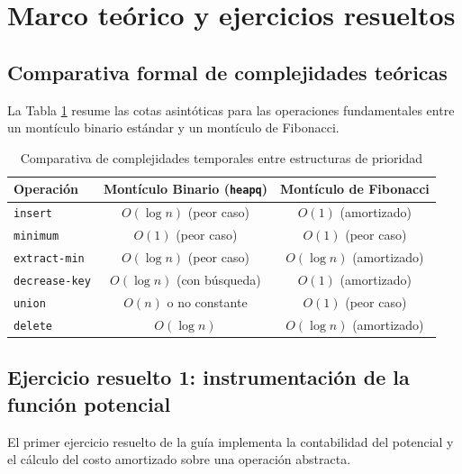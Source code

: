 \section{Marco teórico y ejercicios resueltos}

\subsection{Comparativa formal de complejidades teóricas}
La Tabla \ref{tab:complejidad_teorica} resume las cotas asintóticas para las operaciones fundamentales entre un montículo binario estándar y un montículo de Fibonacci.

\begin{table}[H]
    \caption{Comparativa de complejidades temporales entre estructuras de prioridad}
    \label{tab:complejidad_teorica}
    \centering
    \small
    \begin{tabular*}{\textwidth}{@{\extracolsep{\fill}}lcc}
        \toprule
        \textbf{Operación} & \textbf{Montículo Binario (\texttt{heapq})} & \textbf{Montículo de Fibonacci} \\
        \midrule
        \texttt{insert} & $O(\log n)$ (peor caso) & $O(1)$ (amortizado) \\
        \texttt{minimum} & $O(1)$ (peor caso) & $O(1)$ (peor caso) \\
        \texttt{extract-min} & $O(\log n)$ (peor caso) & $O(\log n)$ (amortizado) \\
        \texttt{decrease-key} & $O(\log n)$ (con búsqueda) & $O(1)$ (amortizado) \\
        \texttt{union} & $O(n)$ o no constante & $O(1)$ (peor caso) \\
        \texttt{delete} & $O(\log n)$ & $O(\log n)$ (amortizado) \\
        \bottomrule
    \end{tabular*}
\end{table}

\subsection{Ejercicio resuelto 1: instrumentación de la función potencial}
El primer ejercicio resuelto de la guía implementa la contabilidad del potencial y el cálculo del costo amortizado sobre una operación abstracta.

